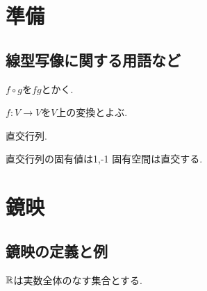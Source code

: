 \chapter{準備}
\section{線型写像に関する用語など}
$f\circ g$を$fg$とかく.

$f\colon V\to V$を$V$上の変換とよぶ.

直交行列.

直交行列の固有値は1,-1
固有空間は直交する.

\chapter{鏡映}

\section{鏡映の定義と例}
$\mathbb{R}$は実数全体のなす集合とする.

